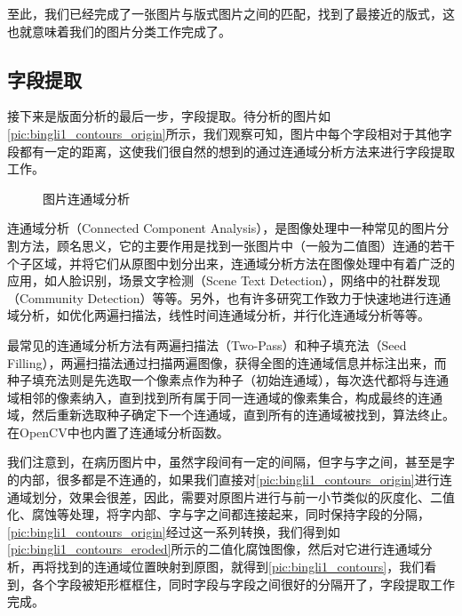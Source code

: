 至此，我们已经完成了一张图片与版式图片之间的匹配，找到了最接近的版式，这也就意味着我们的图片分类工作完成了。

\subsection{字段提取}
接下来是版面分析的最后一步，字段提取。待分析的图片如\autoref{pic:bingli1_contours_origin}所示，我们观察可知，图片中每个字段相对于其他字段都有一定的距离，这使我们很自然的想到的通过连通域分析方法来进行字段提取工作。
\begin{figure}[htbp]
  \centering
  \caption{图片连通域分析}
  \label{pic:connected-component-analysis}
\end{figure}
连通域分析（Connected Component Analysis），是图像处理中一种常见的图片分割方法，顾名思义，它的主要作用是找到一张图片中（一般为二值图）连通的若干个子区域，并将它们从原图中划分出来，连通域分析方法在图像处理中有着广泛的应用，如人脸识别\citep{kuchi2002human}，场景文字检测（Scene Text Detection）\citep{koo2013scene}，网络中的社群发现（Community Detection）\citep{duch2005community}等等。另外，也有许多研究工作致力于快速地进行连通域分析，如优化两遍扫描法\citep{wu2009optimizing}，线性时间连通域分析\citep{suzuki2003linear}，并行化连通域分析\citep{han1990efficient}等等。

最常见的连通域分析方法有两遍扫描法（Two-Pass）和种子填充法（Seed Filling），两遍扫描法通过扫描两遍图像，获得全图的连通域信息并标注出来，而种子填充法则是先选取一个像素点作为种子（初始连通域），每次迭代都将与连通域相邻的像素纳入，直到找到所有属于同一连通域的像素集合，构成最终的连通域，然后重新选取种子确定下一个连通域，直到所有的连通域被找到，算法终止。在OpenCV中也内置了连通域分析函数。

我们注意到，在病历图片中，虽然字段间有一定的间隔，但字与字之间，甚至是字的内部，很多都是不连通的，如果我们直接对\autoref{pic:bingli1_contours_origin}进行连通域划分，效果会很差，因此，需要对原图片进行与前一小节类似的灰度化、二值化、腐蚀等处理，将字内部、字与字之间都连接起来，同时保持字段的分隔，\autoref{pic:bingli1_contours_origin}经过这一系列转换，我们得到如\autoref{pic:bingli1_contours_eroded}所示的二值化腐蚀图像，然后对它进行连通域分析，再将找到的连通域位置映射到原图，就得到\autoref{pic:bingli1_contours}，我们看到，各个字段被矩形框框住，同时字段与字段之间很好的分隔开了，字段提取工作完成。

